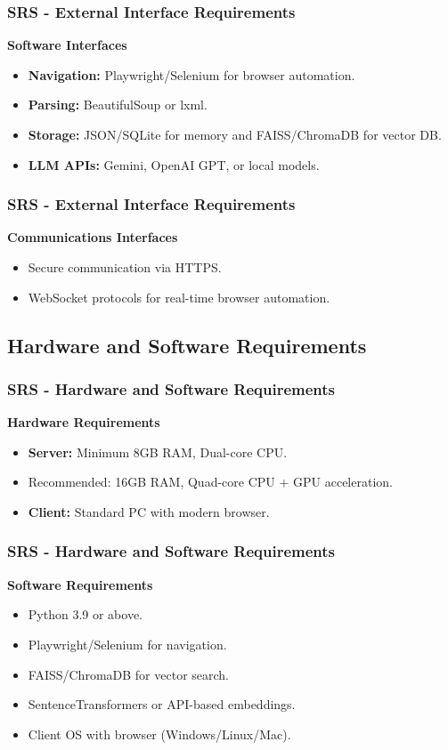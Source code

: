 \documentclass{beamer}
\begin{document}
\begin{frame}
\frametitle{SRS - External Interface Requirements}
\textbf{Software Interfaces}
\begin{itemize}
    \item \textbf{Navigation:} Playwright/Selenium for browser automation.  
    \item \textbf{Parsing:} BeautifulSoup or lxml.  
    \item \textbf{Storage:} JSON/SQLite for memory and FAISS/ChromaDB for vector DB.  
    \item \textbf{LLM APIs:} Gemini, OpenAI GPT, or local models.  
\end{itemize}
\end{frame}

\begin{frame}
\frametitle{SRS - External Interface Requirements}
\textbf{Communications Interfaces}
\begin{itemize}
    \item Secure communication via HTTPS.  
    \item WebSocket protocols for real-time browser automation.  
\end{itemize}
\end{frame}

\subsection{Hardware and Software Requirements}
\begin{frame}
\frametitle{SRS - Hardware and Software Requirements}
\textbf{Hardware Requirements}
\begin{itemize}
    \item \textbf{Server:} Minimum 8GB RAM, Dual-core CPU.  
    \item Recommended: 16GB RAM, Quad-core CPU + GPU acceleration.  
    \item \textbf{Client:} Standard PC with modern browser.  
\end{itemize}
\end{frame}

\begin{frame}
\frametitle{SRS - Hardware and Software Requirements}
\textbf{Software Requirements}
\begin{itemize}
    \item Python 3.9 or above.  
    \item Playwright/Selenium for navigation.  
    \item FAISS/ChromaDB for vector search.  
    \item SentenceTransformers or API-based embeddings.  
    \item Client OS with browser (Windows/Linux/Mac).  
\end{itemize}
\end{frame}
\end{document}
